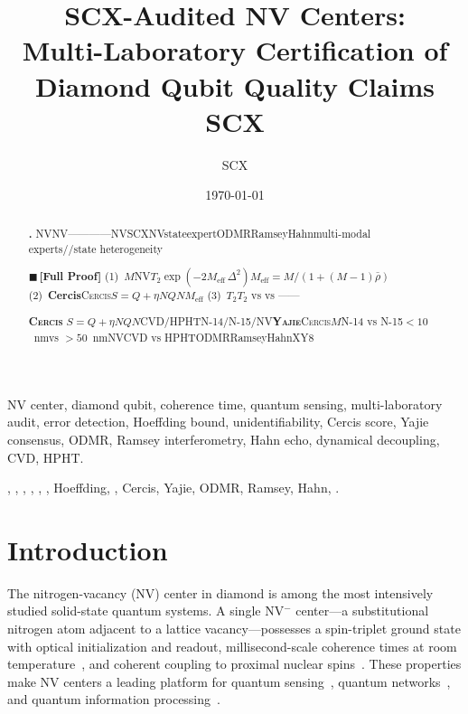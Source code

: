 \documentclass[11pt,a4paper]{article}
\title{\textbf{SCX-Audited NV Centers:}\\[4pt]
       \large Multi-Laboratory Certification of Diamond Qubit Quality Claims\\[4pt]
       \small SCX}
\author{SCX}
\date{\today}
\theoremstyle{definition}
\newcommand{\rigorFull}{{\color{rigorcolor}$\blacksquare$\,\textbf{[Full Proof]}}}
\newcommand{\Yajie}{\textsc{Yajie}}
\newcommand{\Cercis}{\textsc{Cercis}}
\newcommand{\SCX}{\textsc{SCX}}
\newcommand{\Ttwo}{T_2}
\newcommand{\NV}{NV}
\newcommand{\NVminus}{NV${}^-$}
\newcommand{\ODMR}{ODMR}
\begin{document}
\maketitle

\begin{abstract}
\noindent
{\bf .} \NV{}\NV{}————\NV{}\SCX{}\NV{}stateexpert\ODMR{}RamseyHahnmulti-modal experts//state heterogeneity

\rigorFull{}
(1)~{\bf }$M$\NV{}$\Ttwo$$\exp(-2M_{\text{eff}}\,\Delta^2)$$M_{\text{eff}} = M/(1+(M-1)\bar{\rho})$
(2)~{\bf Cercis}\Cercis{}$S = Q + \eta N$$Q$$N$$M_{\text{eff}}$
(3)~{\bf $\Ttwo$}$\Ttwo$ vs  vs ——

{\bf \Cercis{}} $S = Q + \eta N$$Q$$N$CVD/HPHTN-14/N-15/\NV{}{\bf \Yajie{}}\Cercis{}$M$N-14 vs N-15$<10$~nmvs $>50$~nm\NV{}CVD vs HPHT\ODMR{}RamseyHahnXY8


\end{abstract}

\vspace{4pt}
NV center, diamond qubit, coherence time, quantum sensing, multi-laboratory audit,
error detection, Hoeffding bound, unidentifiability, Cercis score, Yajie consensus,
ODMR, Ramsey interferometry, Hahn echo, dynamical decoupling, CVD, HPHT.

\vspace{4pt}
\noindent{\small\bfseries :}
, , , , , ,
Hoeffding, , Cercis, Yajie, ODMR, Ramsey, Hahn, .
\vspace{8pt}

\section{Introduction }
\label{sec:intro}

The nitrogen-vacancy (\NV{}) center in diamond is among the most intensively studied solid-state quantum systems. A single \NVminus{} center—a substitutional nitrogen atom adjacent to a lattice vacancy—possesses a spin-triplet ground state with optical initialization and readout, millisecond-scale coherence times at room temperature~\cite{doherty2013nitrogen,barry2020sensitivity}, and coherent coupling to proximal nuclear spins~\cite{bradley2019ten}. These properties make \NV{} centers a leading platform for quantum sensing~\cite{staudacher2013nuclear}, quantum networks~\cite{hermans2023entangling}, and quantum information processing~\cite{abrahao2025quantum}.
\end{document}
